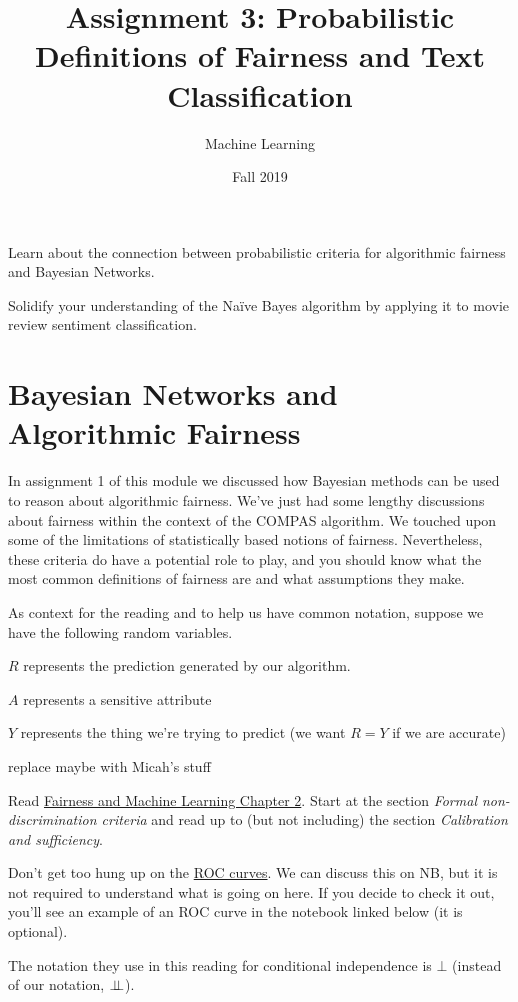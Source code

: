 \documentclass[assignment03_Solutions]{subfiles}
\title{Assignment 3: Probabilistic Definitions of Fairness and Text Classification}
\author{Machine Learning}
\date{Fall 2019}
\begin{document}
\maketitle
\thispagestyle{firstpage}


\begin{learningobjectives}
\bi
\item Learn about the connection between probabilistic criteria for algorithmic fairness and Bayesian Networks.
\item Solidify your understanding of the Na\"ive Bayes algorithm by applying it to movie review sentiment classification.
\ei
\end{learningobjectives}

\section{Bayesian Networks and Algorithmic Fairness}


In assignment 1 of this module we discussed how Bayesian methods can be used to reason about algorithmic fairness.  We've just had some lengthy discussions about fairness within the context of the COMPAS algorithm.  We touched upon some of the limitations of statistically based notions of fairness.  Nevertheless, these criteria do have a potential role to play, and you should know what the most common definitions of fairness are and what assumptions they make.

As context for the reading and to help us have common notation, suppose we have the following random variables.

\bi
\item $R$ represents the prediction generated by our algorithm.
\item $A$ represents a sensitive attribute
\item $Y$ represents the thing we're trying to predict (we want $R = Y$ if we are accurate)
\ei

\todo replace maybe with Micah's stuff
\begin{externalresources}[(40 minutes)]
Read \href{https://fairmlbook.org/classification.html}{Fairness and Machine Learning Chapter 2}.  Start at the section \emph{Formal non-discrimination criteria} and read up to (but not including) the section \emph{Calibration and sufficiency}.
\begin{notice}
\bi
\item Don't get too hung up on the \href{https://en.wikipedia.org/wiki/Receiver_operating_characteristic}{ROC curves}.  We can discuss this on NB, but it is not required to understand what is going on here.  If you decide to check it out, you'll see an example of an ROC curve in the notebook linked below (it is optional).
\item The notation they use in this reading for conditional independence is $\bot$ (instead of our notation, $\perp\!\!\!\perp$).
\ei
\end{notice}
\end{externalresources}
\end{document}
